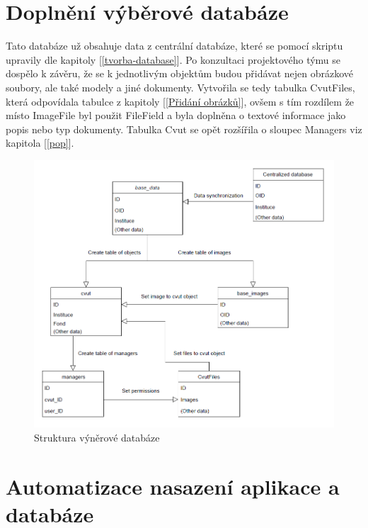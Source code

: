 \section{Doplnění výběrové databáze}

Tato databáze už obsahuje data z centrální databáze, které se pomocí
skriptu upravily dle kapitoly [\ref{tvorba-database}]. Po konzultaci
projektového týmu se dospělo k závěru, že se k jednotlivým objektům
budou přidávat nejen obrázkové soubory, ale také modely a jiné
dokumenty. Vytvořila se tedy tabulka CvutFiles, která odpovídala
tabulce z kapitoly [\ref{Přidání obrázků}], ovšem s tím rozdílem že místo
ImageFile byl použit FileField a byla doplněna o textové informace
jako popis nebo typ dokumenty. Tabulka Cvut se opět rozšířila o
sloupec Managers viz kapitola [\ref{pop}].

\begin{figure}[H] \centering
    \includegraphics[width=400pt]{./pictures/23-db-diagram-2.PNG}
    \caption[Struktura výběrové databáze]{Struktura výněrové databáze}
	\label{fig:Struktura výběrové databáze}              
\end{figure}

\newpage

\section{Automatizace nasazení aplikace a databáze}


